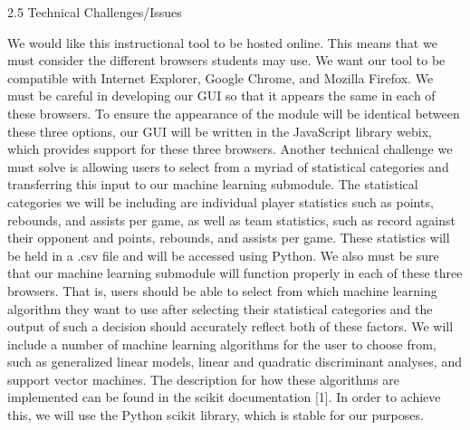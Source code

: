 \documentclass[letterpaper, 10pt,titlepage]{article}
\begin{document}
\begin{section}{2.5 Technical Challenges/Issues}


We would like this instructional tool to be hosted online. This means that we must consider the different browsers students may use. We want our tool to be compatible with Internet Explorer, Google Chrome, and Mozilla Firefox. We must be careful in developing our GUI so that it appears the same in each of these browsers. To ensure the appearance of the module will be identical between these three options, our GUI will be written in the JavaScript library webix, which provides support for these three browsers. Another technical challenge we must solve is allowing users to select from a myriad of statistical categories and transferring this input to our machine learning submodule. The statistical categories we will be including are individual player statistics such as points, rebounds, and assists per game, as well as team statistics, such as record against their opponent and points, rebounds, and assists per game. These statistics will be held in a .csv file and will be accessed using Python. We also must be sure that our machine learning submodule will function properly in each of these three browsers. That is, users should be able to select from which machine learning algorithm they want to use after selecting their statistical categories and the output of such a decision should accurately reflect both of these factors. We will include a number of machine learning algorithms for the user to choose from, such as generalized linear models, linear and quadratic discriminant analyses, and support vector machines. The description for how these algorithms are implemented can be found in the scikit documentation [1]. In order to achieve this, we will use the Python scikit library, which is stable for our purposes.  


\bigbreak
\bigbreak
\bigbreak
\end{section}
\end{document}
